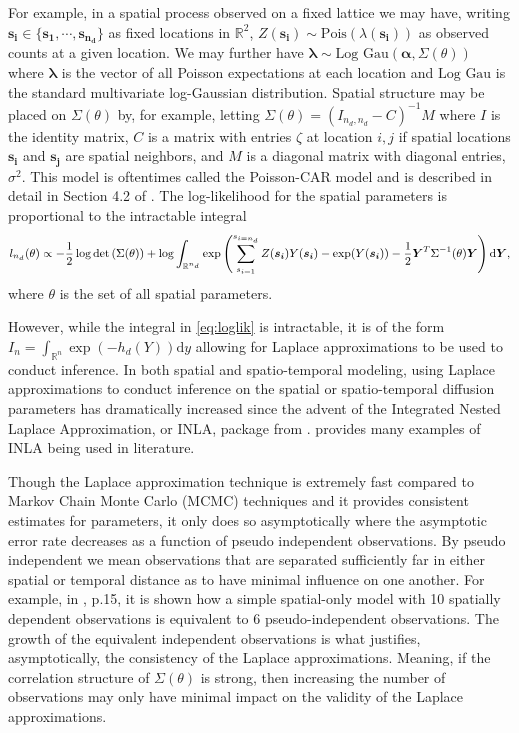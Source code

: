 \documentclass[11pt]{isuthesis}
\begin{document}
	For example, in a spatial process observed on a fixed lattice we may have, writing $\boldsymbol{s_i} \in \{\boldsymbol{s_1},\cdots,\boldsymbol{s_{n_d}}\}$ as fixed locations in $\mathbb{R}^2$, $Z(\boldsymbol{s_i})\sim \mbox{Pois}(\lambda(\boldsymbol{s_i}))$ as observed counts at a given location.  We may further have $\boldsymbol{\lambda} \sim \mbox{Log Gau} (\boldsymbol{\alpha}, \Sigma(\theta))$ where $\boldsymbol{\lambda}$ is the vector of all Poisson expectations at each location and $\mbox{Log Gau}$ is the standard multivariate log-Gaussian distribution. Spatial structure may be placed on $\Sigma(\theta)$ by, for example, letting $\Sigma(\theta) = (I_{n_d,n_d}-C)^{-1}M$ where $I$ is the identity matrix, $C$ is a matrix with entries   $\zeta$ at location $i,j$ if spatial locations $\boldsymbol{s_i}$ and $\boldsymbol{s_j}$ are spatial neighbors, and $M$ is a diagonal matrix with diagonal entries, $\sigma^2$.  This model is oftentimes called the Poisson-CAR model and is described in detail in Section 4.2 of \cite{cressie2015statistics}.  The log-likelihood for the spatial parameters is proportional to the intractable integral
	\begin{equation}
	\small l_{n_d}(\theta) \propto -\frac{1}{2}\log \det \left(\Sigma (\theta)\right) + \log \int_{\mathbb{R}^{n_d}} \exp \left(\sum_{s_{i=1}}^{s_{i={n_d}}} Z(\boldsymbol{s_i})Y(\boldsymbol{s_i})-\exp(Y(\boldsymbol{s_i})) - \frac{1}{2} \boldsymbol{Y}^T \Sigma^{-1}(\theta) \boldsymbol{Y} \right) \text{d} \boldsymbol{Y} \label{eq:loglik},
	\end{equation}
	where $\theta$ is the set of all spatial parameters.
	
	
	However, while the integral in \eqref{eq:loglik} is intractable, it is of the form $I_n = \int_{\mathbb{R}^n} \exp(-h_{d}\left(Y\right)) \text{d}y$ allowing for Laplace approximations to be used to conduct inference.  In both spatial and spatio-temporal modeling, using Laplace approximations to conduct inference on the spatial or spatio-temporal diffusion parameters has dramatically increased since the advent of the Integrated Nested Laplace Approximation, or INLA, package from \cite{rue2009approximate}.  \cite{rue2017bayesian} provides many examples of INLA being used in literature.
	
	Though the Laplace approximation technique is extremely fast compared to Markov Chain Monte Carlo (MCMC) techniques and it provides consistent estimates for parameters, it only does so asymptotically where the asymptotic error rate decreases as a function of pseudo independent observations.  By pseudo independent we mean observations that are separated sufficiently far in either spatial or temporal distance as to have minimal influence on one another.  For example, in \cite{cressie1992statistics}, p.15, it is shown how a simple spatial-only model with 10 spatially dependent observations is equivalent to 6 pseudo-independent observations.  The growth of the equivalent independent observations is what justifies, asymptotically, the consistency of the Laplace approximations.  Meaning, if the correlation structure of $\Sigma(\theta)$ is strong, then increasing the number of observations may only have minimal impact on the validity of the Laplace approximations. 
	
\end{document}

